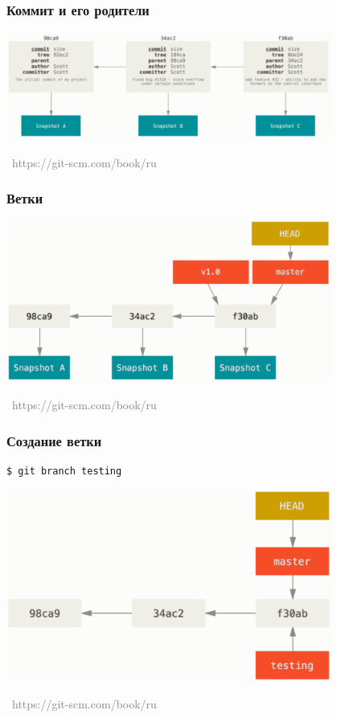 \documentclass[xetex,mathserif,serif]{beamer}
\newcommand{\attribution}[1] {
	\vspace{-5mm}\begin{flushright}\begin{scriptsize}\textcolor{gray}{\textcopyright\, #1}\end{scriptsize}\end{flushright}
}
\begin{document}
	\begin{frame}
		\frametitle{Коммит и его родители}
		\begin{center}
			\includegraphics[width=0.8\textwidth]{commits.png}
			\attribution{https://git-scm.com/book/ru}
		\end{center}
	\end{frame}

	\begin{frame}
		\frametitle{Ветки}
		\begin{center}
			\includegraphics[width=0.8\textwidth]{branches.png}
			\attribution{https://git-scm.com/book/ru}
		\end{center}
	\end{frame}

	\begin{frame}[fragile]
		\frametitle{Создание ветки}
		\begin{verbatim}
$ git branch testing
		\end{verbatim}
		\begin{center}
			\includegraphics[width=0.8\textwidth]{creatingBranch.png}
			\attribution{https://git-scm.com/book/ru}
		\end{center}
	\end{frame}
\end{document}
